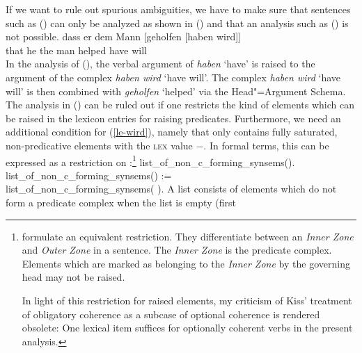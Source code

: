If we want to rule out spurious ambiguities, we have to make sure that sentences such as () can only be analyzed
as shown in () and that an analysis such as () is not possible.
\ea
\label{bsp-non-complex-forming}
\gll dass er dem Mann [geholfen [haben wird]]\\
     that he the man  \spacebr{}helped \spacebr{}have will\\

\z
%
In the analysis of (), the verbal argument of \emph{haben} `have' is raised to the argument
of the complex \emph{haben wird} `have will'.
The complex \emph{haben wird} `have will' is then combined with \emph{geholfen} `helped' via the Head"=Argument Schema. The analysis in ()
can be ruled out if one restricts the kind of elements which can be raised in the lexicon entries for raising predicates.
Furthermore, we need an additional condition for (\ref{le-wird}), namely that  only
contains fully saturated, non-predicative elements with the \textsc{lex} value $-$. In formal terms, this can be expressed as a restriction on :\footnote{%
		\citet{BvN98a} formulate an equivalent restriction. They differentiate between an
		\emph{Inner Zone} and \emph{Outer Zone} in a sentence. The \emph{Inner Zone} 
		is the predicate complex. Elements which are marked as belonging to the \emph{Inner Zone}
		by the governing head may not be raised.

In light of this restriction for raised elements, my criticism \citep[--352]{Mueller99a} of Kiss' treatment of
		obligatory coherence as a subcase of optional coherence \citep[]{Kiss95a} is rendered obsolete: One lexical
		item suffices for optionally coherent verbs in the present analysis.
}
\ea
\label{constr-non-complex-forming}
list\_of\_non\_c\_forming\_synsems(\eliste).\\
list\_of\_non\_c\_forming\_synsems() :=\\
\flushright        list\_of\_non\_c\_forming\_synsems(  ).
\z
A list consists of elements which do not form a predicate complex when the list is empty (first
